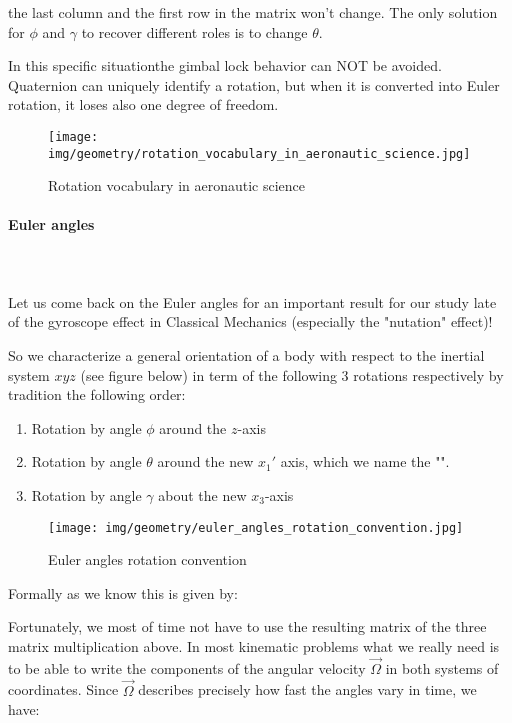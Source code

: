 	the last column and the first row in the matrix won't change. The only solution for $\phi$  and $\gamma$  to recover different roles is to change $\theta$.
	
	In this specific situationthe gimbal lock behavior can NOT be avoided. Quaternion can uniquely identify a rotation, but when it is converted into Euler rotation, it loses also one degree of freedom. 
	\begin{figure}[H]
		\centering
		\texttt{[image: img/geometry/rotation\_vocabulary\_in\_aeronautic\_science.jpg]}
		\caption{Rotation vocabulary in aeronautic science}
	\end{figure}
	
	\pagebreak
	\paragraph{Euler angles}\mbox{}\\\\
	Let us come back on the Euler angles for an important result for our study late of the gyroscope effect in Classical Mechanics (especially the "nutation" effect)!
		
		So we characterize a general orientation of a body with respect to the inertial system $xyz$ (see figure below) in term of the following $3$ rotations respectively by tradition the following order:
	\begin{enumerate}
		\item Rotation by angle $\phi$ around the $z$-axis
		\item Rotation by angle $\theta$ around the new $x_1'$ axis, which we name the "".
		\item Rotation by angle $\gamma$ about the new $x_3$-axis
	\end{enumerate}
	\begin{figure}[H]
		\centering
		\texttt{[image: img/geometry/euler\_angles\_rotation\_convention.jpg]}
		\caption{Euler angles rotation convention}
	\end{figure}
	Formally as we know this is given by:
	
	Fortunately, we most of time not have to use the resulting matrix of the three matrix multiplication above. In most kinematic problems what we really need is to be able to write the components of the angular velocity $\vec{\Omega}$ in both systems of coordinates. Since $\vec{\Omega}$­ describes precisely how fast the angles vary in time, we have:
	
